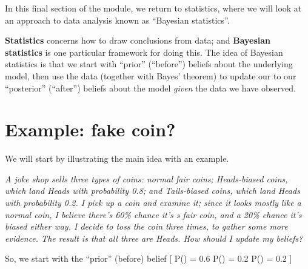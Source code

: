 \documentclass[
  letterpaper,
]{report}
\theoremstyle{definition}
\theoremstyle{definition}
\theoremstyle{remark}
\begin{document}
In this final section of the module, we return to statistics, where we
will look at an approach to data analysis known as ``Bayesian
statistics''.

\textbf{Statistics} concerns how to draw conclusions from data; and
\textbf{Bayesian statistics} is one particular framework for doing this.
The idea of Bayesian statistics is that we start with ``prior''
(``before'') beliefs about the underlying model, then use the data
(together with Bayes' theorem) to update our to our ``posterior''
(``after'') beliefs about the model \emph{given} the data we have
observed.

\hypertarget{fake-coin}{%
\section{Example: fake coin?}\label{fake-coin}}

We will start by illustrating the main idea with an example.

\emph{A joke shop sells three types of coins: normal fair coins;
Heads-biased coins, which land Heads with probability 0.8; and
Tails-biased coins, which land Heads with probability 0.2. I pick up a
coin and examine it; since it looks mostly like a normal coin, I believe
there's 60\% chance it's s fair coin, and a 20\% chance it's biased
either way. I decide to toss the coin three times, to gather some more
evidence. The result is that all three are Heads. How should I update my
beliefs?}

So, we start with the ``prior'' (before) belief {[}
\mathbb P() = 0.6 \qquad \mathbb P() = 0.2
\qquad \mathbb P() = 0.2 {]}
\end{document}
